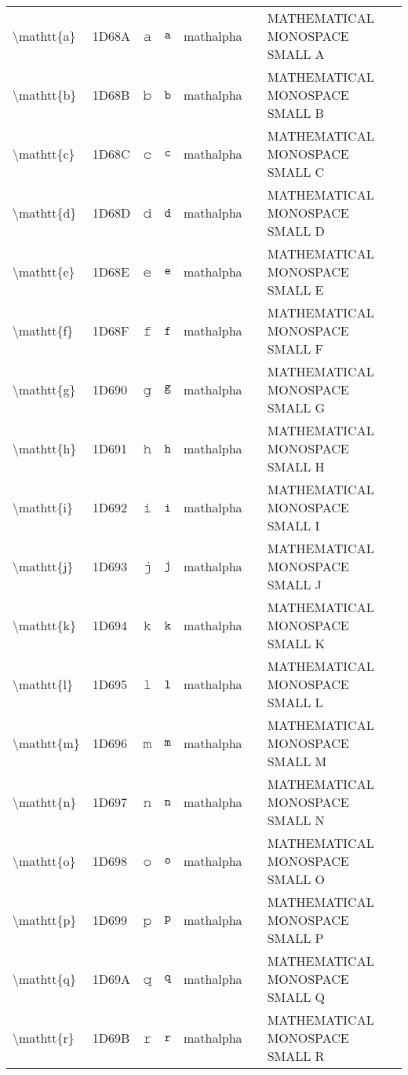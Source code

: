 \documentclass[a4paper,landscape]{article}
\begin{document}
\begin{longtable}{llcclll}
\textbackslash{}mathtt\{a\} & 1D68A & 𝚊 & $\mathtt{a}$ & mathalpha &  & MATHEMATICAL MONOSPACE SMALL A \\
\textbackslash{}mathtt\{b\} & 1D68B & 𝚋 & $\mathtt{b}$ & mathalpha &  & MATHEMATICAL MONOSPACE SMALL B \\
\textbackslash{}mathtt\{c\} & 1D68C & 𝚌 & $\mathtt{c}$ & mathalpha &  & MATHEMATICAL MONOSPACE SMALL C \\
\textbackslash{}mathtt\{d\} & 1D68D & 𝚍 & $\mathtt{d}$ & mathalpha &  & MATHEMATICAL MONOSPACE SMALL D \\
\textbackslash{}mathtt\{e\} & 1D68E & 𝚎 & $\mathtt{e}$ & mathalpha &  & MATHEMATICAL MONOSPACE SMALL E \\
\textbackslash{}mathtt\{f\} & 1D68F & 𝚏 & $\mathtt{f}$ & mathalpha &  & MATHEMATICAL MONOSPACE SMALL F \\
\textbackslash{}mathtt\{g\} & 1D690 & 𝚐 & $\mathtt{g}$ & mathalpha &  & MATHEMATICAL MONOSPACE SMALL G \\
\textbackslash{}mathtt\{h\} & 1D691 & 𝚑 & $\mathtt{h}$ & mathalpha &  & MATHEMATICAL MONOSPACE SMALL H \\
\textbackslash{}mathtt\{i\} & 1D692 & 𝚒 & $\mathtt{i}$ & mathalpha &  & MATHEMATICAL MONOSPACE SMALL I \\
\textbackslash{}mathtt\{j\} & 1D693 & 𝚓 & $\mathtt{j}$ & mathalpha &  & MATHEMATICAL MONOSPACE SMALL J \\
\textbackslash{}mathtt\{k\} & 1D694 & 𝚔 & $\mathtt{k}$ & mathalpha &  & MATHEMATICAL MONOSPACE SMALL K \\
\textbackslash{}mathtt\{l\} & 1D695 & 𝚕 & $\mathtt{l}$ & mathalpha &  & MATHEMATICAL MONOSPACE SMALL L \\
\textbackslash{}mathtt\{m\} & 1D696 & 𝚖 & $\mathtt{m}$ & mathalpha &  & MATHEMATICAL MONOSPACE SMALL M \\
\textbackslash{}mathtt\{n\} & 1D697 & 𝚗 & $\mathtt{n}$ & mathalpha &  & MATHEMATICAL MONOSPACE SMALL N \\
\textbackslash{}mathtt\{o\} & 1D698 & 𝚘 & $\mathtt{o}$ & mathalpha &  & MATHEMATICAL MONOSPACE SMALL O \\
\textbackslash{}mathtt\{p\} & 1D699 & 𝚙 & $\mathtt{p}$ & mathalpha &  & MATHEMATICAL MONOSPACE SMALL P \\
\textbackslash{}mathtt\{q\} & 1D69A & 𝚚 & $\mathtt{q}$ & mathalpha &  & MATHEMATICAL MONOSPACE SMALL Q \\
\textbackslash{}mathtt\{r\} & 1D69B & 𝚛 & $\mathtt{r}$ & mathalpha &  & MATHEMATICAL MONOSPACE SMALL R \\

\end{longtable}
\end{document}
